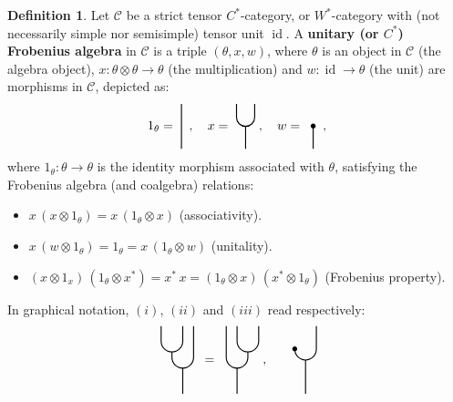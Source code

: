 \documentclass[11pt,a4paper]{article}
\makeatletter
\newcommand{\C}{\mathcal{C}}
\DeclareMathOperator{\id}{id}
\newcommand{\Cstar}{$C^\ast$\@\xspace}
\newcommand{\Wstar}{$W^\ast$\@\xspace}
\theoremstyle{plain}
\theoremstyle{definition}
\newtheorem{defi}[thm]{Definition}
\theoremstyle{remark}
\numberwithin{equation}{section}%
\newcommand{\tikzmath}[2][]
     {\vcenter{\hbox{
     \begin{tikzpicture}[#1]#2
     \end{tikzpicture}}}
     }
\makeatother
\begin{document}
\begin{defi}\label{def:uFralgebraobject}
Let $\C$ be a strict tensor \Cstar-category, or \Wstar-category with (not necessarily simple nor semisimple) tensor unit $\id$. A \textbf{unitary (or \Cstar) Frobenius algebra} in $\C$ is a triple $(\theta,x,w)$, where $\theta$ is an object in $\C$ (the algebra object), $x:\theta\otimes\theta \to\theta$ (the multiplication) and $w:\id \to \theta$ (the unit) are morphisms in $\C$, depicted as:
\begin{align}
1_\theta = \tikzmath[scale=.5]{
\draw[thick] (.25,1.25) -- (.25,-1.25);
}\;\;,
\quad
x = \tikzmath[scale=.5]{
\draw[thick] (-.25,1.25) -- (-.25,.5) arc (180:360:.5) -- (.75,1.25);
\draw[thick] (.25,0) -- (.25,-1.25);
}\;,
\quad
w = \!\! \tikzmath[scale=.5]{
\draw[thick, white] (-.25,1.25) -- (-.25,.5) arc (180:360:.5) -- (.75,1.25);
\draw[thick] (.25,0) node {$\bullet$} -- (.25,-1.25);
},
\end{align}
where $1_\theta : \theta \to \theta$ is the identity morphism associated with $\theta$, satisfying the Frobenius algebra (and coalgebra) relations:
\begin{itemize}
\item[$(i)$] $x \, (x \otimes 1_\theta) = x \, (1_\theta \otimes x)$ (associativity).
\item[$(ii)$] $x \, (w \otimes 1_\theta) = 1_\theta = x \, (1_\theta \otimes w)$ (unitality).
\item[$(iii)$] $(x \otimes 1_x) \, (1_\theta \otimes x^*) = x^* \, x = (1_\theta \otimes x) \, (x^* \otimes 1_\theta)$ (Frobenius property).
\end{itemize}
In graphical notation, $(i)$, $(ii)$ and $(iii)$ read respectively:
\begin{align}
\tikzmath[scale=.75]{
\draw[thick] (-.3,1.25) -- (-.3,.7) arc (180:360:.4) -- (.5,1.25);
\draw[thick] (.1,.3) -- (.1,.1);
\draw[thick] (.1,.1)  arc (180:360:.4) -- (.9,1.25);
\draw[thick] (.5,-.3) -- (.5,-1.25);
}\;\; = \;
\tikzmath[scale=.75]{
\begin{scope}[xscale=-1]
\draw[thick] (-.3,1.25) -- (-.3,.7) arc (180:360:.4) -- (.5,1.25);
\draw[thick] (.1,.3) -- (.1,.1);
\draw[thick] (.1,.1)  arc (180:360:.4) -- (.9,1.25);
\draw[thick] (.5,-.3) -- (.5,-1.25);
\end{scope}
}\;,
\quad\,
\tikzmath[scale=.75]{
\draw[thick] (-.25,.4) node {$\bullet$} arc (180:360:.4) -- (.55,1.25);
\draw[thick] (.15,0) -- (.15,-1.25);
}
\end{align}
\end{defi}
\end{document}
